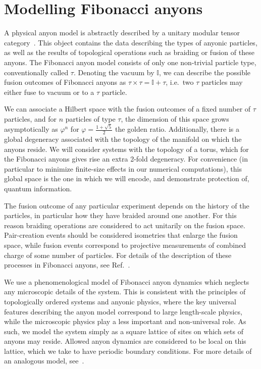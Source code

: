 \documentclass[aps, pra, a4paper, 11pt, nofootinbib, superscriptaddress, tightenlines, 
notitlepage, longbibliography]{revtex4}
\begin{document}
\section{Modelling Fibonacci anyons}\label{s:model}

	A physical anyon model is abstractly described by a unitary modular tensor category~\cite{?}. This object contains the data describing the types of anyonic particles, as well as the results of topological operations such as braiding or fusion of these anyons. The Fibonacci anyon model consists of only one non-trivial particle type, conventionally called $\tau$. Denoting the vacuum by $\mathbb{I}$, we can describe the possible fusion outcomes of Fibonacci anyons as $\tau\times\tau=\mathbb{I}+\tau$, i.e.~two $\tau$ particles may either fuse to vacuum or to a $\tau$ particle.

	We can associate a Hilbert space with the fusion outcomes of a fixed number of $\tau$ particles, and for $n$ particles of type $\tau$, the dimension of this space grows asymptotically as $\varphi^n$ for $\varphi=\frac{1+\sqrt{5}}{2}$ the golden ratio. Additionally, there is a global degeneracy associated with the topology of the manifold on which the anyons reside. We will consider systems with the topology of a torus, which for the Fibonacci anyons gives rise an extra 2-fold degeneracy. For convenience (in particular to minimize finite-size effects in our numerical computations), this global space is the one in which we will encode, and demonstrate protection of, quantum information.
	
	The fusion outcome of any particular experiment depends on the history of the particles, in particular how they have braided around one another. For this reason braiding operations are considered to act unitarily on the fusion space. Pair-creation events should be considered isometries that enlarge the fusion space, while fusion events correspond to projective measurements of combined charge of some number of particles. For details of the description of these processes in Fibonacci anyons, see Ref.~\cite{?}.

	We use a phenomenological model of Fibonacci anyon dynamics which neglects any microscopic details of the system. This is consistent with the principles of topologically ordered systems and anyonic physics, where the key universal features describing the anyon model correspond to large length-scale physics, while the microscopic physics play a less important and non-universal role. As such, we model the system simply as a square lattice of sites on which sets of anyons may reside. Allowed anyon dynamics are considered to be local on this lattice, which we take to have periodic boundary conditions. For more details of an analogous model, see~\cite{Brell2013}.
\end{document}
